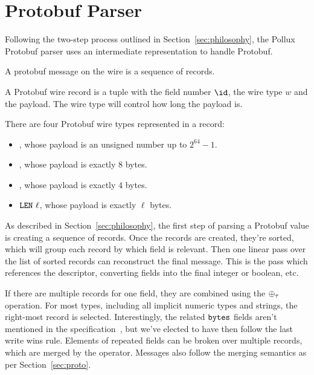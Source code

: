 \section{Protobuf Parser}\label{sec:proto-parse}

Following the two-step process outlined in Section~\ref{sec:philosophy}, the
Pollux Protobuf parser uses an intermediate representation to handle Protobuf.

A protobuf message on the wire is a sequence of records.

\vspace{1em}
\begin{definition}
  A Protobuf wire record is a tuple with the field number $\id$, the wire type $w$
  and the payload. The wire type will control how long the payload is.
\end{definition}

\vspace{1em}
\begin{definition}
  There are four Protobuf wire types represented in a record:
  \begin{itemize}
  \item \wtvar, whose payload is an unsigned number up to $2^{64} - 1$.
  \item \wtil, whose payload is exactly 8 bytes.
  \item \wtis, whose payload is exactly 4 bytes.
  \item $\texttt{LEN}~{\ell}$, whose payload is exactly $\ell$ bytes.
  \end{itemize}
\end{definition}

As described in Section~\ref{sec:philosophy}, the first step of parsing a
Protobuf value is creating a sequence of records. Once the records are created,
they're sorted, which will group each record by which field is relevant. Then
one linear pass over the list of sorted records can reconstruct the final
message. This is the pass which references the descriptor, converting \wtvar{}
fields into the final integer or boolean, etc.

If there are multiple records for one field, they are combined using the
$\oplus_{\tau}$ operation. For most types, including all implicit numeric types
and strings, the right-most record is selected. Interestingly, the related
$\texttt{bytes}$ fields aren't mentioned in the specification~\cite{Encoding}, but we've
elected to have then follow the last write wins rule. Elements of repeated
fields can be broken over multiple records, which are merged by the
operator. Messages also follow the merging semantics as per
Section~\ref{sec:proto}.

